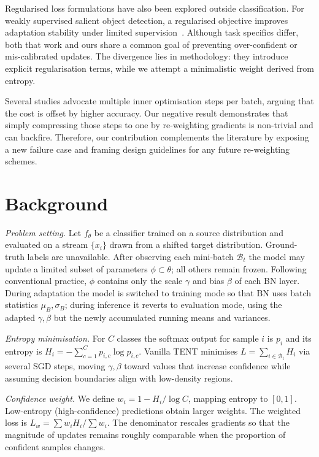 \documentclass{article} %
\begin{document}
Regularised loss formulations have also been explored outside classification. For weakly supervised salient object detection, a regularised objective improves adaptation stability under limited supervision~\cite{author-year-test}. Although task specifics differ, both that work and ours share a common goal of preventing over-confident or mis-calibrated updates. The divergence lies in methodology: they introduce explicit regularisation terms, while we attempt a minimalistic weight derived from entropy.

Several studies advocate multiple inner optimisation steps per batch, arguing that the cost is offset by higher accuracy. Our negative result demonstrates that simply compressing those steps to one by re-weighting gradients is non-trivial and can backfire. Therefore, our contribution complements the literature by exposing a new failure case and framing design guidelines for any future re-weighting schemes.

\section{Background}
\label{sec:background}
\textit{Problem setting.} Let \(f_{\theta}\) be a classifier trained on a source distribution and evaluated on a stream \(\{x_i\}\) drawn from a shifted target distribution. Ground-truth labels are unavailable. After observing each mini-batch \(\mathcal{B}_t\) the model may update a limited subset of parameters \(\phi \subset \theta\); all others remain frozen. Following conventional practice, \(\phi\) contains only the scale \(\gamma\) and bias \(\beta\) of each BN layer. During adaptation the model is switched to training mode so that BN uses batch statistics \(\mu_{B}, \sigma_{B}\); during inference it reverts to evaluation mode, using the adapted \(\gamma, \beta\) but the newly accumulated running means and variances.

\textit{Entropy minimisation.} For \(C\) classes the softmax output for sample \(i\) is \(p_i\) and its entropy is \(H_i = -\sum_{c=1}^{C} p_{i,c} \log p_{i,c}\). Vanilla TENT minimises \(L = \sum_{i\in\mathcal{B}_t} H_i\) via several SGD steps, moving \(\gamma, \beta\) toward values that increase confidence while assuming decision boundaries align with low-density regions.

\textit{Confidence weight.} We define \(w_i = 1 - H_i / \log C\), mapping entropy to \([0,1]\). Low-entropy (high-confidence) predictions obtain larger weights. The weighted loss is \(L_{w} = \sum w_i H_i / \sum w_i\). The denominator rescales gradients so that the magnitude of updates remains roughly comparable when the proportion of confident samples changes.
\end{document}
